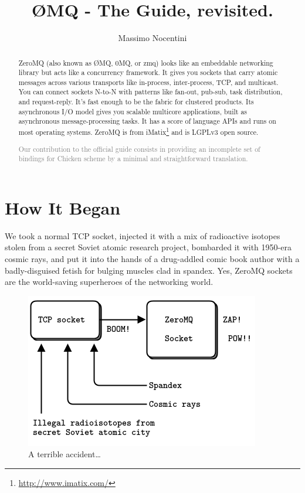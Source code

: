 \documentclass[a4paper,12pt]{article}
\author{Massimo Nocentini}
\title{ØMQ - The Guide, revisited.}
\newcommand{\mycontent}[1]{\textcolor{gray}{#1}}
\begin{document}
\maketitle

\begin{abstract}
ZeroMQ (also known as ØMQ, 0MQ, or zmq) looks like an embeddable networking
library but acts like a concurrency framework. It gives you sockets that carry
atomic messages across various transports like in-process, inter-process, TCP,
and multicast. You can connect sockets N-to-N with patterns like fan-out,
pub-sub, task distribution, and request-reply. It's fast enough to be the
fabric for clustered products. Its asynchronous I/O model gives you scalable
multicore applications, built as asynchronous message-processing tasks. It has
a score of language APIs and runs on most operating systems. ZeroMQ is from
iMatix\footnote{\url{http://www.imatix.com/}} and is LGPLv3 open source.

\mycontent{Our contribution to the official guide \citep{Hintjens:guide} consists in
providing an incomplete set of bindings for Chicken scheme by a minimal and
straightforward translation.}
\end{abstract}

\section*{How It Began}

We took a normal TCP socket, injected it with a mix of radioactive isotopes
stolen from a secret Soviet atomic research project, bombarded it with 1950-era
cosmic rays, and put it into the hands of a drug-addled comic book author with
a badly-disguised fetish for bulging muscles clad in spandex. Yes, ZeroMQ
sockets are the world-saving superheroes of the networking world.
\begin{figure}[H]
\centering
\includegraphics{figures/fig1.png}
\caption{A terrible accident…}
\end{figure}
\end{document}
